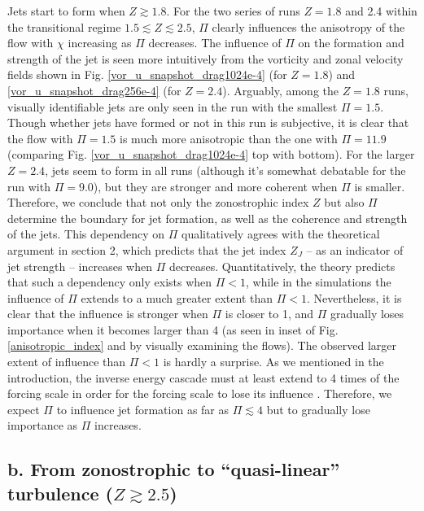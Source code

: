 \documentclass{jfm}
\begin{document}
Jets start to form when $Z\apprge1.8$. For the two series of runs
$Z=1.8$ and 2.4 within the transitional regime $1.5\apprle Z\apprle2.5$,
$\Pi$ clearly influences the anisotropy of the flow with $\chi$ increasing
as $\Pi$ decreases. The influence of $\Pi$ on the formation and
strength of the jet is seen more intuitively from the vorticity and zonal
velocity fields shown in Fig. \ref{vor_u_snapshot_drag1024e-4} (for
$Z=1.8$) and \ref{vor_u_snapshot_drag256e-4} (for $Z=2.4$). Arguably,
among the $Z=1.8$ runs, visually identifiable jets are only seen in the
run with the smallest $\Pi=1.5$. Though whether jets have formed
or not in this run is subjective, it is clear that the flow with $\Pi=1.5$
is much more anisotropic than the one with $\Pi=11.9$ (comparing
Fig. \ref{vor_u_snapshot_drag1024e-4} top with bottom). For the larger
$Z=2.4$, jets seem to form in all runs (although it's somewhat debatable for the run with
$\Pi=9.0$), but they are stronger and more coherent when $\Pi$ is
smaller. Therefore, we conclude that not only the zonostrophic index
$Z$ but also $\Pi$ determine the boundary for jet formation, as
well as the coherence and strength of the jets. This dependency on
$\Pi$ qualitatively agrees with the theoretical argument in section 2, which predicts that the
jet index $Z_{J}$ -- as an indicator of jet strength -- increases
when $\Pi$ decreases. Quantitatively, the theory predicts that
such a dependency only exists when $\Pi<1$, while in the simulations the
influence of $\Pi$ extends to a much greater extent than $\Pi<1$.
Nevertheless, it is clear that the influence is stronger
when $\Pi$ is closer to 1, and $\Pi$ gradually loses importance
when it becomes larger than 4 (as seen in inset of Fig. \ref{anisotropic_index}
and by visually examining the flows).
The observed larger extent of influence than $\Pi<1$ is hardly a
surprise. As we mentioned in the introduction, the inverse energy cascade
must at least extend to 4 times of the forcing scale in order for
the forcing scale to lose its influence \citep{Chen2006}. Therefore,
we expect $\Pi$ to influence jet formation as far as $\Pi\apprle4$
but to gradually lose importance as $\Pi$ increases.


\subsection*{b. From zonostrophic to ``quasi-linear'' turbulence ($Z\apprge2.5$)}
\end{document}
